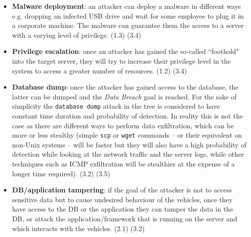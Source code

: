 \begin{itemize}
	\item \textbf{Malware deployment}: an attacker can deploy a malware in different ways e.g. dropping an infected USB drive and wait for some employee to plug it in a corporate machine. The malware can guarantee them the access to a server with a varying level of privilege. (1.3) (3.4)
	
	\item \textbf{Privilege escalation}: once an attacker has gained the so-called ``foothold" into the target server, they will try to increase their privilege level in the system to access a greater number of resources. (1.2) (3.4)	
	
	\item \textbf{Database dump}: once the attacker has gained access to the database, the latter can be dumped and the \textit{Data Breach} goal is reached. For the sake of simplicity the \texttt{database dump} attack in the tree is considered to have constant time duration and probability of detection. In reality this is not the case as there are different ways to perform data exfiltration, which can be more or less stealthy (simple \texttt{scp} or \texttt{wget} commands -- or their equivalent on non-Unix systems -- will be faster but they will also have a high probability of detection while looking at the network traffic and the server logs, while other techniques such as ICMP exfiltration will be stealthier at the expense of a longer time required). (3.2) (3.5)
	
	\item \textbf{DB/application tampering}: if the goal of the attacker is not to access sensitive data but to cause undesired behaviour of the vehicles, once they have access to the DB or the application they can tamper the data in the DB, or attack the application/framework that is running on the server and which interacts with the vehicles. (2.1) (3.2)
\end{itemize}